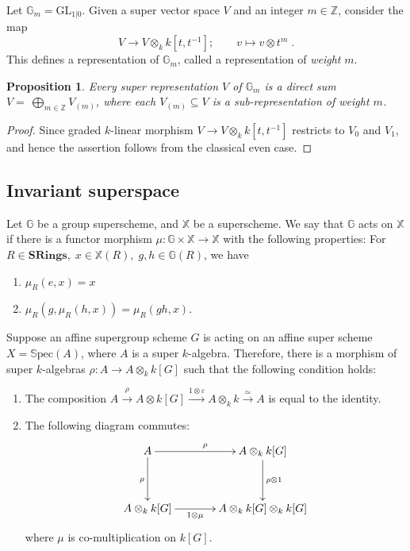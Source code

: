 \documentclass[12pt, reqno]{amsart}
\theoremstyle{plain}
\newtheorem{proposition}[theorem]{Proposition}
\numberwithin{equation}{section}
\def \Z{\mathbb{Z}}
\def \ra{\rightarrow}
\def \G{\mathbb{G}}
\def \X{\mathbb{X}}
\newcommand{\Gm}{\mathbb{G}_m}
\newcommand{\Spec}[1]{\mathbb{S}\mathrm{pec}(#1)}
\begin{document}
Let $\Gm = \mathrm{GL}_{1|0}$. Given a super vector space $V$ and
an integer $m\in \Z$, consider the map
$$
V \ra V\otimes_k k[t, t^{-1}]; \quad \quad v\mapsto v\otimes t^m \;.
$$
This defines a representation of $\Gm$, called a representation of \emph{weight} $m$. 

\begin{proposition}\label{prop-Gm}
    Every super representation $V$ of $\Gm$ is a direct sum $V = \ \bigoplus_{m\in \Z} V_{(m)}$, where each $V_{(m)}\subseteq V$
    is a sub-representation of weight $m$.
\end{proposition}
\begin{proof}
Since graded $k$-linear morphism $V \to V \otimes_k k[t, t^{-1}]$ restricts to $V_0$
and $V_1$, and hence the assertion follows from the classical even case.
\end{proof}
\subsection{Invariant superspace}
Let $\G$ be a 
group superscheme, and $\X$ be a superscheme. We say that $\G$ acts on $\X$ if there is a functor morphism 
$\mu \colon \G \times \X \ra \X$ with the following properties: 
For $R\in \mathbf{SRings},\; x\in \X(R), \; g,h\in \G(R)$, we have
\begin{enumerate}
\item $\mu_R(e, x) = x$
\item $\mu_R(g, \mu_R(h, x)) = \mu_R(gh, x)$.
\end{enumerate}

Suppose an affine supergroup scheme $G$ is acting on an affine super scheme $X = \Spec A$, where $A$ is a super $k$-algebra.
Therefore, there is a morphism of super $k$-algebras 
$\rho\colon A\ra A\otimes_k k[G]$ such that the following condition 
holds:
\begin{enumerate}
    \item The composition $A \stackrel{\rho}{\ra} A\otimes k[G] \stackrel{1\otimes \varepsilon}{\ra} A\otimes_k k \stackrel{\simeq}{\ra} A$ is equal to the identity.
    \item The following diagram commutes:
    \[
    \xymatrix@C=3.0pc @R=3.0pc{
A \ar[r]^\rho \ar[d]_\rho & A\otimes_k k[G] \ar[d]^{\rho\otimes 1} \\
A\otimes_k k[G] \ar[r]_-{1\otimes \mu} & A\otimes_k k[G]\otimes_k k[G]
}
    \]
    where $\mu$ is co-multiplication on $k[G]$.
\end{enumerate}
\end{document}
